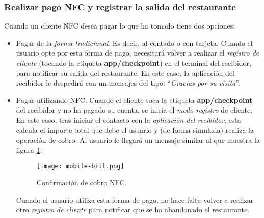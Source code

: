 \subsubsection{Realizar pago \acs{NFC} y registrar la salida del restaurante}
Cuando un cliente \acs{NFC} desea pagar lo que ha tomado tiene dos opciones:
\begin{itemize}
\item Pagar de la \emph{forma tradicional}. Es decir, al contado o con tarjeta.
Cuando el usuario opte por esta forma de pago, necesitará volver a realizar
el \emph{registro de cliente} (tocando la etiqueta \textbf{app/checkpoint}) en
el terminal del recibidor, para notificar su salida del restaurante. En este 
caso, la aplicación del recibidor le despedirá con un mensajes del tipo:
``\emph{Gracias por su visita}''.
\item Pagar utilizando \acs{NFC}. Cuando el cliente toca la etiqueta
\textbf{app/checkpoint} del recibidor y no ha pagado su cuenta, se inicia el
\emph{modo registro} de cliente. En este caso, tras iniciar el contacto con
la \emph{aplicación del recibidor}, esta calcula el importe total que debe el 
usuario y (de forma simulada) realiza la operación de cobro. Al usuario le
llegará un mensaje similar al que muestra la figura \ref{fig:mobile-bill}:

  \begin{figure}[H]
    \begin{center}
      \texttt{[image: mobile-bill.png]}
      \caption{Confirmación de cobro \acs{NFC}.}
      \label{fig:mobile-bill}
    \end{center}
  \end{figure}

Cuando el usuario utiliza esta forma de pago, no hace falta volver a realizar
otro \emph{registro de cliente} para notificar que se ha abandonado el
restaurante.
\end{itemize}



